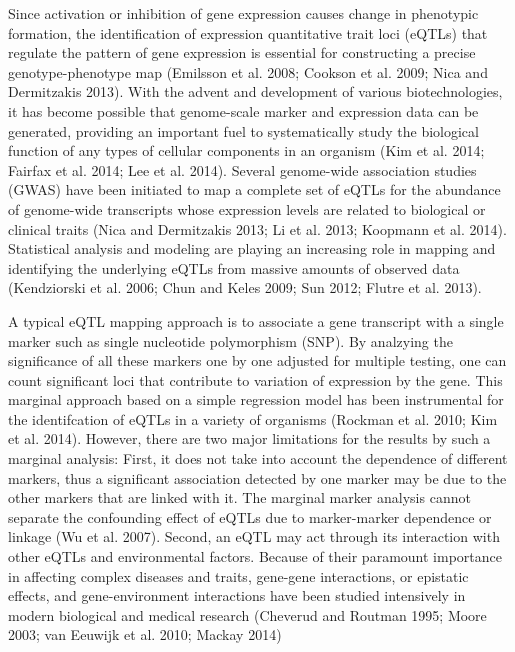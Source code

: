 \documentclass[]{book}
\theoremstyle{definition}
\theoremstyle{definition}
\theoremstyle{remark}
\begin{document}
Since activation or inhibition of gene expression causes change in
phenotypic formation, the identification of expression quantitative
trait loci (eQTLs) that regulate the pattern of gene expression is
essential for constructing a precise genotype-phenotype map (Emilsson et
al. 2008; Cookson et al. 2009; Nica and Dermitzakis 2013). With the
advent and development of various biotechnologies, it has become
possible that genome-scale marker and expression data can be generated,
providing an important fuel to systematically study the biological
function of any types of cellular components in an organism (Kim et al.
2014; Fairfax et al. 2014; Lee et al. 2014). Several genome-wide
association studies (GWAS) have been initiated to map a complete set of
eQTLs for the abundance of genome-wide transcripts whose expression
levels are related to biological or clinical traits (Nica and
Dermitzakis 2013; Li et al. 2013; Koopmann et al. 2014). Statistical
analysis and modeling are playing an increasing role in mapping and
identifying the underlying eQTLs from massive amounts of observed data
(Kendziorski et al. 2006; Chun and Keles 2009; Sun 2012; Flutre et al.
2013).

A typical eQTL mapping approach is to associate a gene transcript with a
single marker such as single nucleotide polymorphism (SNP). By analzying
the significance of all these markers one by one adjusted for multiple
testing, one can count significant loci that contribute to variation of
expression by the gene. This marginal approach based on a simple
regression model has been instrumental for the identifcation of eQTLs in
a variety of organisms (Rockman et al. 2010; Kim et al. 2014). However,
there are two major limitations for the results by such a marginal
analysis: First, it does not take into account the dependence of
different markers, thus a significant association detected by one marker
may be due to the other markers that are linked with it. The marginal
marker analysis cannot separate the confounding effect of eQTLs due to
marker-marker dependence or linkage (Wu et al. 2007). Second, an eQTL
may act through its interaction with other eQTLs and environmental
factors. Because of their paramount importance in affecting complex
diseases and traits, gene-gene interactions, or epistatic effects, and
gene-environment interactions have been studied intensively in modern
biological and medical research (Cheverud and Routman 1995; Moore 2003;
van Eeuwijk et al. 2010; Mackay 2014)
\end{document}
